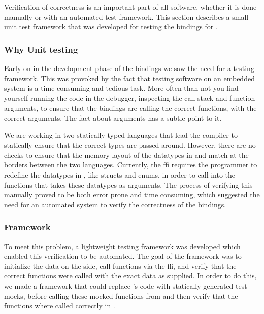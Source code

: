 Verification of correctness is an important part of all software, whether it is done manually or with an automated test framework.
This section describes a small unit test framework that was developed for testing the bindings for {\emlib}.

\subsubsection{Why Unit testing}

Early on in the development phase of the {\emlib} bindings we saw the need for a testing framework.
This was provoked by the fact that testing software on an embedded system is a time consuming and tedious task.
More often than not you find yourself running the code in the debugger, inspecting the call stack and function arguments, to ensure that the bindings are calling the correct functions, with the correct arguments.
The fact about arguments has a subtle point to it.

We are working in two statically typed languages that lead the compiler to statically ensure that the correct types are passed around.
However, there are no checks to ensure that the memory layout of the datatypes in {\C} and {\rust} match at the borders between the two languages.
Currently, the {\rust} \gls{ffi} requires the programmer to redefine the {\C} datatypes in {\rust}, like structs and enums, in order to call into the {\C} functions that takes these datatypes as arguments.
The process of verifying this manually proved to be both error prone and time consuming, which suggested the need for an automated system to verify the correctness of the bindings.

\subsubsection{Framework}

To meet this problem, a lightweight testing framework was developed which enabled this verification to be automated.
The goal of the framework was to initialize the data on the {\rust} side, call functions via the \gls{ffi}, and verify that the correct functions were called with the exact data as supplied.
In order to do this, we made a framework that could replace {\emlib}'s code with statically generated test mocks, before calling these mocked functions from {\rust} and then verify that the functions where called correctly in {\C}.

